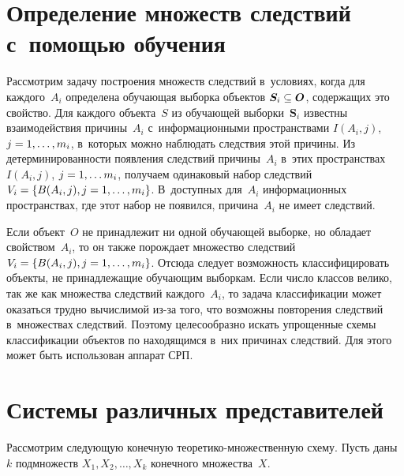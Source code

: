 \begin{multicols}{2}
\vspace*{-3pt}
  
  \section{Определение множеств следствий с~помощью обучения}
  
  \vspace*{-3pt}
  
  Рассмотрим задачу построения множеств следствий в~условиях, когда для 
каждого~$A_i$ определена обуча\-ющая выборка объектов $\bm{S}_i\hm\subseteq 
\bm{O}$, содержащих это свойство. Для каж\-до\-го объекта~$S$ из обуча\-ющей 
выборки~$\bm{S}_i$ известны взаимодействия причины~$A_i$ 
с~информационными пространствами $I(A_i, j)$, $j\hm= 1,\ldots , m_i$, в~которых 
мож\-но наблюдать следствия этой причины. Из детерминированности появления 
следствий причины~$A_i$ в~этих пространствах $I(A_i, j)$, $j\hm=1,\ldots m_i$, 
получаем одинаковый набор следствий $V_i\hm= \{ B(A_i, j), j\hm= 1,\ldots , 
m_i\}$. В~до\-ступ\-ных для~$A_i$ информационных пространствах, где этот набор 
не появился, причина~$A_i$ не имеет следствий.
  
  Если объект~$O$ не принадлежит ни одной обуча\-ющей выборке, но обладает 
свойством~$A_i$, то он так\-же по\-рож\-да\-ет множество следствий $V_i \hm=\{B(A_i, 
j), j\hm=1,\ldots , m_i\}$. Отсюда следует \mbox{воз\-мож\-ность} классифицировать объекты, 
не при\-над\-ле\-жа\-щие обуча\-ющим вы\-бор\-кам. Если чис\-ло классов велико, так же как 
множества следствий каждого~$A_i$, то задача классификации может оказаться 
труд\-но вы\-чис\-ли\-мой из-за того, что воз\-мож\-ны повторения следствий в~множествах 
следствий. Поэтому целесообразно искать упрощенные схемы классификации 
объектов по находящимся в~них причинах следствий. Для этого может быть 
использован аппарат СРП.

  
  \section{Системы различных представителей}
  
  
  Рассмотрим сле\-ду\-ющую конечную тео\-ре\-ти\-ко-мно\-жест\-вен\-ную схему. 
Пусть даны $k$ подмножеств $X_1, X_2, \ldots , X_k$ конечного множества~$X$.
  

\end{multicols}
